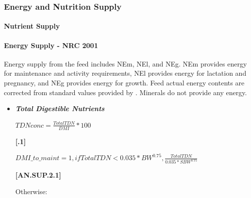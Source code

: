 \begin{refsection}
\subsubsection{Energy and Nutrition Supply }
\vspace{0.25cm}

\paragraph{Nutrient Supply}

\paragraph{Energy Supply - NRC 2001}
\vspace{0.2cm}

 Energy supply from the feed includes NEm, NEl, and NEg. NEm provides energy for maintenance and activity requirements, NEl provides energy for lactation and pregnancy, and NEg provides energy for growth. Feed actual energy contents are corrected from standard values provided by \textcite{nrc2001}. Minerals do not provide any energy.
    \vspace{0.2cm}

    \begin{itemize}
    \item \textbf{\textit{Total Digestible Nutrients}} 
    \vspace{0.25cm}

    \begin{center}
    \(TDNconc = \frac{TotalTDN}{DMI} * 100\)
    \end{center}
    \vspace{0.5cm}
    
            {\raggedleft \textbf{[.1]}\par}
            \vspace{0.5cm}

    \begin{center}
    \(DMI\_to\_maint = 1, if TotalTDN < 0.035 * BW^{0.75}, \frac{TotalTDN}{0.035*SBW^{0.75}}\)
    \end{center}
    \vspace{0.5cm}
    
            {\raggedleft \textbf{[AN.SUP.2.1]}\par}
            \vspace{0.5cm}

    Otherwise: 
    \vspace{0.1cm}
    

\end{itemize}
\end{refsection}
